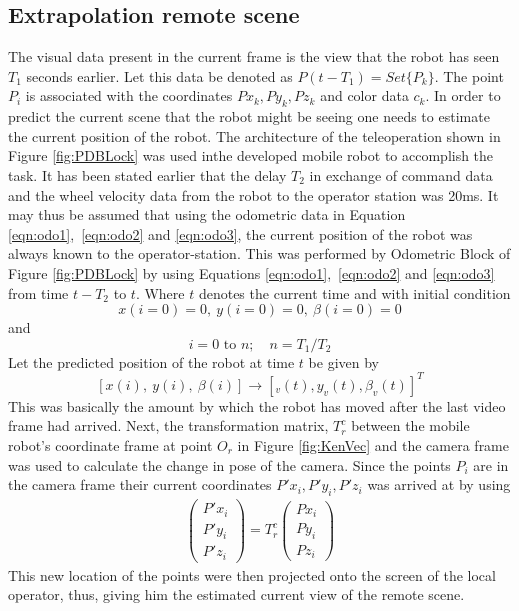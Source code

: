 \subsection{Extrapolation remote scene } 
The visual data present in the current frame is the view that the robot has seen $T_1$ seconds earlier. Let this data be denoted as $P(t-T_1)=Set\{P_k\}$. The point $P_i$ is associated with the coordinates ${Px_k,Py_k,Pz_k}$ and color data $c_k$. In order to predict the current scene that the robot might be seeing one needs to estimate the current position of the robot. The  architecture of the teleoperation shown in Figure \ref{fig:PDBLock} was used inthe developed mobile robot to accomplish the task.
 It has been stated earlier that the delay $T_2$ in exchange of command data and the wheel velocity data from the robot to the operator station was 20ms. It may thus be assumed that  using the odometric data in Equation \ref{eqn:odo1},~\ref{eqn:odo2} and \ref{eqn:odo3}, the current position of the robot was always known to the operator-station. This was performed by Odometric Block of Figure \ref{fig:PDBLock} by using Equations \ref{eqn:odo1},~\ref{eqn:odo2} and \ref{eqn:odo3} from time $t-T_2$ to $t$. Where $t$ denotes the current time and  with initial condition \[x(i=0)=0,~y(i=0)=0 ,~ \beta(i=0)=0\] and  \[ i=0 \text{ to } n;  \quad n=T_1/T_2\] 
 Let the predicted position of the robot at time $t$ be given by 
\[[x(i),~y(i) ,~ \beta(i)]\rightarrow [_v(t),y_v(t),\beta_v(t)]^T\]
This was basically the amount by which the robot has moved after the last video frame had arrived. Next, the transformation matrix, $T^c_r$ between the mobile robot's coordinate frame at point $O_r$ in Figure \ref{fig:KenVec} and the camera frame was used to calculate the change in pose of the camera. Since the points $P_i$ are in the camera frame their current coordinates ${P'x_i,P'y_i,P'z_i}$ was arrived at by using 
\begin{eqnarray}
\begin{pmatrix}
P'x_i \\ P'y_i \\P'z_i
\end{pmatrix}=T^c_r
\begin{pmatrix}
Px_i\\Py_i\\Pz_i
\end{pmatrix}
\end{eqnarray}
This new location of the points were then  projected onto the screen of the local operator, thus, giving him the estimated current view of the remote scene. 
